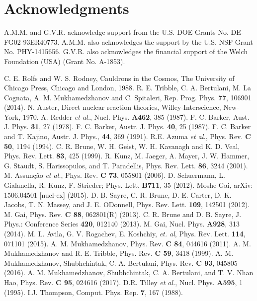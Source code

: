 \documentclass[prl,unsortedaddress,groupedaddress,twocolumn,amsmath,amsfonts,amssymb,showpacs,floatfix,nofootinbib]{revtex4}
\begin{document}
\section{Acknowledgments}

A.M.M. and G.V.R. acknowledge support from the U.S. DOE Grants
No. DE-FG02-93ER40773. A.M.M. also acknowledges the support
by the U.S. NSF Grant No. PHY-1415656. G.V.R. also acknowledges the financial support of the Welch
Foundation (USA) (Grant No. A-1853).







\begin{thebibliography}{99}
  C. E. Rolfs and W. S. Rodney, Cauldrons in the Cosmos, The University of Chicago Press, Chicago and London, 1988.
 R. E. Tribble, C. A.  Bertulani, M. La Cognata, A. M. Mukhamedzhanov
and C. Spitaleri, Rep. Prog. Phys. {\bf 77},  106901 (2014).
 N. Auster, Direct nuclear reaction theories, Willey-Interscience, New-York, 1970.
 A. Redder {\it et al.},  Nucl. Phys. {\bf A462}, 385 (1987).
 F. C. Barker, Aust. J. Phys. {\bf 31}, 27 (1978).
 F. C. Barker, Austr. J. Phys. {\bf 40}, 25 (1987). 
 F. C. Barker and T. Kajino, Austr. J. Phys., {\bf 44}, 369 (1991).
 R.E. Azuma {\it et al.}, Phys. Rev. {\bf C 50}, 1194  (1994).
 C. R. Brune, W. H. Geist, W. H. Kavanagh and K. D. Veal, Phys. Rev. Lett. {\bf 83}, 425 (1999). 
 R. Kunz, M. Jaeger, A. Mayer, J. W. Hammer, G. Staudt,
S. Harissopulos, and T. Paradellis, Phys. Rev. Lett. {\bf 86}, 3244 (2001).
 M. Assun\c c\~ao {\it et al.}, Phys. Rev. {\bf C 73}, 055801 (2006).
  D. Schuermann, L. Gialanella, R. Kunz, F. Strieder; Phys. Lett. {\bf B711}, 35 (2012).
  Moshe Gai, arXiv: 1506.04501 [nucl-ex] (2015).
 D. B. Sayre, C. R. Brune, D. E. Carter, D. K. Jacobs, T. N. Massey, and J. E. ODonnell, Phys. Rev. Lett. {\bf 109}, 142501 (2012).
 M. Gai, Phys. Rev. {\bf C 88}, 062801(R) (2013).
 C. R. Brune and D. B. Sayre, J. Phys.: Conference Series {\bf 420}, 012140 (2013).
 M. Gai, Nucl. Phys. {\bf A928}, 313 (2014).
 M. L. Avila, G. V. Rogachev, E. Koshchiy, {\it et. al}, Phys. Rev. Lett. {\bf 114}, 071101
(2015).
  A. M.  Mukhamedzhanov,  Phys. Rev. {\bf C 84},  044616   (2011).
   A. M. Mukhamedzhanov and R. E. Tribble, Phys. Rev. {\bf C 59},  3418  (1999).
  A. M. Mukhamedzhanov, Shubhchintak,  C. A. Bertulani, Phys. Rev. {\bf C 93}, 045805 (2016).
  A. M. Mukhamedzhanov,  Shubhchintak,  C. A. Bertulani, and T. V. Nhan Hao,  Phys. Rev. {\bf C 95}, 024616 (2017).
 D.R. Tilley {\it et al.},  Nucl. Phys. {\bf A595}, 1 (1995).
  I.J. Thompson, Comput. Phys. Rep. {\bf 7}, 167 (1988).


\end{thebibliography}
\end{document}
